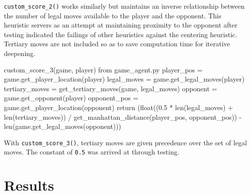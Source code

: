 \documentclass[12pt]{article}
\newcommand{\code}[2][python]{\texttt{#2}}
\begin{document}
\code{custom_score_2()} works similarly but maintains an inverse
relationship between the number of legal moves available to the player and the 
opponent. This heuristic servers as an attempt at maintaining proximity
to the opponent after testing indicated the failings of other heuristics
against the centering heuristic. Tertiary moves are not included so as to save
computation time for iterative deepening.

\begin{codeblock}{custom\_score\_3(game, player) from game\_agent.py}
    player_pos      =  game.get_player_location(player)
    legal_moves     =  game.get_legal_moves(player)
    tertiary_moves  =  get_tertiary_moves(game, legal_moves)
    opponent        =  game.get_opponent(player)
    opponent_pos    =  game.get_player_location(opponent)
    return (float((0.5 * len(legal_moves) + len(tertiary_moves))
                  / get_manhattan_distance(player_pos, opponent_pos))
            - len(game.get_legal_moves(opponent)))
\end{codeblock}

With \code{custom_score_3()}, tertiary moves are given precedence over the set
of legal moves. The constant of \code{0.5} was arrived at through testing.

\section*{Results}
\end{document}
